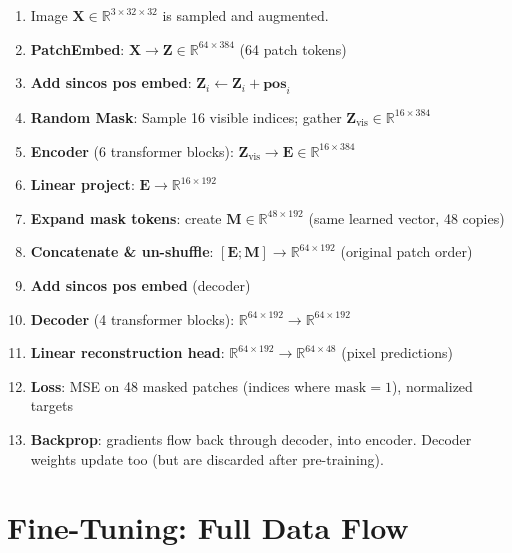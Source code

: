 \documentclass[12pt, a4paper]{report}
\newcommand{\R}{\mathbb{R}}
\newcommand{\mat}[1]{\mathbf{#1}}
\newcommand{\vect}[1]{\bm{#1}}
\begin{document}
\begin{enumerate}
    \item Image $\mat{X} \in \R^{3 \times 32 \times 32}$ is sampled and augmented.
    \item \textbf{PatchEmbed}: $\mat{X} \to \mat{Z} \in \R^{64 \times 384}$ (64 patch tokens)
    \item \textbf{Add sincos pos embed}: $\mat{Z}_i \leftarrow \mat{Z}_i + \vect{pos}_{i}$
    \item \textbf{Random Mask}: Sample 16 visible indices; gather $\mat{Z}_{\text{vis}} \in \R^{16 \times 384}$
    \item \textbf{Encoder} (6 transformer blocks): $\mat{Z}_{\text{vis}} \to \mat{E} \in \R^{16 \times 384}$
    \item \textbf{Linear project}: $\mat{E} \to \R^{16 \times 192}$
    \item \textbf{Expand mask tokens}: create $\mat{M} \in \R^{48 \times 192}$ (same learned vector, 48 copies)
    \item \textbf{Concatenate \& un-shuffle}: $[\mat{E}; \mat{M}] \to \R^{64 \times 192}$ (original patch order)
    \item \textbf{Add sincos pos embed} (decoder)
    \item \textbf{Decoder} (4 transformer blocks): $\R^{64 \times 192} \to \R^{64 \times 192}$
    \item \textbf{Linear reconstruction head}: $\R^{64 \times 192} \to \R^{64 \times 48}$ (pixel predictions)
    \item \textbf{Loss}: MSE on 48 masked patches (indices where $\text{mask}=1$), normalized targets
    \item \textbf{Backprop}: gradients flow back through decoder, into encoder. Decoder weights update too (but are discarded after pre-training).
\end{enumerate}

\section{Fine-Tuning: Full Data Flow}
\end{document}
